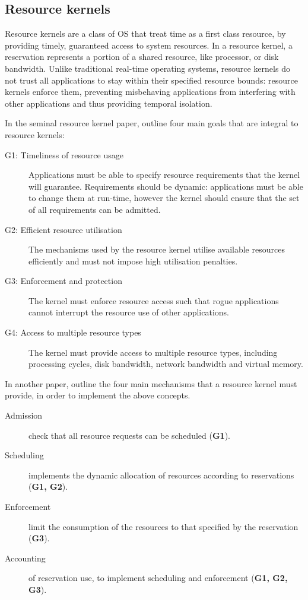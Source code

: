 \subsection{Resource kernels}
\label{sec:resource-kernels}

Resource kernels are a class of \gls{OS} that treat time as a first class resource, by providing
timely, guaranteed access to system resources.  In a resource kernel, a reservation represents a
portion of a shared resource, like processor, or disk bandwidth.  Unlike traditional real-time
operating systems, resource kernels do not trust all applications to stay within their specified
resource bounds: resource kernels enforce them, preventing misbehaving applications from interfering
with other applications and thus providing temporal isolation.

In the seminal resource kernel paper, \citet{Rajkumar_JMO_98} outline four main goals that are
integral to resource kernels:
\begin{description}
    \item[G1: Timeliness of resource usage] Applications must be able to specify resource
        requirements that the kernel will guarantee.  Requirements should be dynamic: applications
        must be able to change them at run-time, however the kernel should ensure that the set of
        all requirements can be admitted.
    \item[G2: Efficient resource utilisation] The mechanisms used by the resource kernel utilise
        available resources efficiently and must not impose high utilisation penalties.
    \item[G3: Enforcement and protection] The kernel must enforce resource access such that rogue
        applications cannot interrupt the resource use of other applications.
    \item[G4: Access to multiple resource types] The kernel must provide access to multiple resource
        types, including processing cycles, disk bandwidth, network bandwidth and virtual memory.
\end{description}

In another paper, \citet{deNiz_LSR_01} outline the four main mechanisms that a resource kernel must
provide, in order to implement the above concepts.

\begin{description}
	\item[Admission] check that all resource requests can be scheduled (\textbf{G1}).
	\item[Scheduling] implements the dynamic allocation of resources according to reservations (\textbf{G1, G2}).
	\item[Enforcement] limit the consumption of the resources to that specified by the
        reservation (\textbf{G3}).
	\item[Accounting] of reservation use, to implement scheduling and enforcement (\textbf{G1, G2, G3}).
\end{description}

